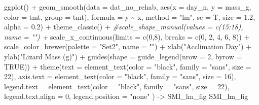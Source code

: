 \documentclass[
]{article}
\newenvironment{Shaded}{\begin{snugshade}}{\end{snugshade}}
\newcommand{\AttributeTok}[1]{\textcolor[rgb]{0.77,0.63,0.00}{#1}}
\newcommand{\CommentTok}[1]{\textcolor[rgb]{0.56,0.35,0.01}{\textit{#1}}}
\newcommand{\ConstantTok}[1]{\textcolor[rgb]{0.00,0.00,0.00}{#1}}
\newcommand{\DecValTok}[1]{\textcolor[rgb]{0.00,0.00,0.81}{#1}}
\newcommand{\FloatTok}[1]{\textcolor[rgb]{0.00,0.00,0.81}{#1}}
\newcommand{\FunctionTok}[1]{\textcolor[rgb]{0.00,0.00,0.00}{#1}}
\newcommand{\NormalTok}[1]{#1}
\newcommand{\OtherTok}[1]{\textcolor[rgb]{0.56,0.35,0.01}{#1}}
\newcommand{\SpecialCharTok}[1]{\textcolor[rgb]{0.00,0.00,0.00}{#1}}
\newcommand{\StringTok}[1]{\textcolor[rgb]{0.31,0.60,0.02}{#1}}
\begin{document}
\begin{Shaded}
\begin{Highlighting}[]
\FunctionTok{ggplot}\NormalTok{() }\SpecialCharTok{+} 
  \FunctionTok{geom\_smooth}\NormalTok{(}\AttributeTok{data =}\NormalTok{ dat\_no\_rehab,}
              \FunctionTok{aes}\NormalTok{(}\AttributeTok{x =}\NormalTok{ day\_n,}
                  \AttributeTok{y =}\NormalTok{ mass\_g, }
                  \AttributeTok{color =}\NormalTok{ tmt,}
                  \AttributeTok{group =}\NormalTok{ tmt),}
              \AttributeTok{formula =}\NormalTok{ y }\SpecialCharTok{\textasciitilde{}}\NormalTok{ x, }
              \AttributeTok{method =} \StringTok{"lm"}\NormalTok{, }
              \AttributeTok{se =}\NormalTok{ T, }
              \AttributeTok{size =} \FloatTok{1.2}\NormalTok{, }
              \AttributeTok{alpha =} \FloatTok{0.2}\NormalTok{) }\SpecialCharTok{+} 
  \FunctionTok{theme\_classic}\NormalTok{() }\SpecialCharTok{+} 
  \CommentTok{\#scale\_shape\_manual(values = c(15:18), name = "") +}
  \FunctionTok{scale\_x\_continuous}\NormalTok{(}\AttributeTok{limits =} \FunctionTok{c}\NormalTok{(}\DecValTok{0}\NormalTok{,}\DecValTok{8}\NormalTok{),}
                     \AttributeTok{breaks =} \FunctionTok{c}\NormalTok{(}\DecValTok{0}\NormalTok{, }\DecValTok{2}\NormalTok{, }\DecValTok{4}\NormalTok{, }\DecValTok{6}\NormalTok{, }\DecValTok{8}\NormalTok{)) }\SpecialCharTok{+}
  \FunctionTok{scale\_color\_brewer}\NormalTok{(}\AttributeTok{palette =} \StringTok{"Set2"}\NormalTok{, }\AttributeTok{name =} \StringTok{""}\NormalTok{) }\SpecialCharTok{+}
  \FunctionTok{xlab}\NormalTok{(}\StringTok{"Acclimation Day"}\NormalTok{) }\SpecialCharTok{+} 
  \FunctionTok{ylab}\NormalTok{(}\StringTok{"Lizard Mass (g)"}\NormalTok{) }\SpecialCharTok{+} 
  \FunctionTok{guides}\NormalTok{(}\AttributeTok{shape =} \FunctionTok{guide\_legend}\NormalTok{(}\AttributeTok{nrow =} \DecValTok{2}\NormalTok{, }\AttributeTok{byrow =} \ConstantTok{TRUE}\NormalTok{)) }\SpecialCharTok{+}
  \FunctionTok{theme}\NormalTok{(}\AttributeTok{text =} \FunctionTok{element\_text}\NormalTok{(}\AttributeTok{color =} \StringTok{"black"}\NormalTok{, }
                            \AttributeTok{family =} \StringTok{"sans"}\NormalTok{, }
                            \AttributeTok{size =} \DecValTok{22}\NormalTok{),}
        \AttributeTok{axis.text =} \FunctionTok{element\_text}\NormalTok{(}\AttributeTok{color =} \StringTok{"black"}\NormalTok{, }
                                 \AttributeTok{family =} \StringTok{"sans"}\NormalTok{, }
                                 \AttributeTok{size =} \DecValTok{16}\NormalTok{),}
        \AttributeTok{legend.text =} \FunctionTok{element\_text}\NormalTok{(}\AttributeTok{color =} \StringTok{"black"}\NormalTok{, }
                                 \AttributeTok{family =} \StringTok{"sans"}\NormalTok{, }
                                 \AttributeTok{size =} \DecValTok{22}\NormalTok{),}
        \AttributeTok{legend.text.align =} \DecValTok{0}\NormalTok{,}
        \AttributeTok{legend.position =} \StringTok{"none"}
\NormalTok{) }\OtherTok{{-}\textgreater{}}\NormalTok{ SMI\_lm\_fig}
\NormalTok{SMI\_lm\_fig}
\end{Highlighting}
\end{Shaded}
\end{document}
